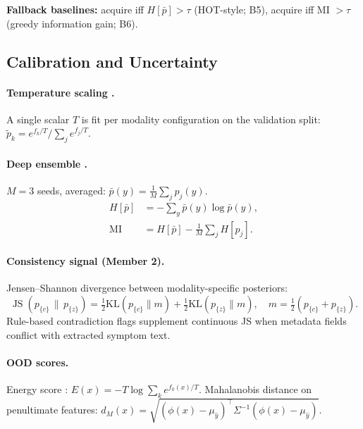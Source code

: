 \documentclass[conference]{IEEEtran}
\DeclareMathOperator{\JS}{JS}
\newcommand{\1}{\mathbf{1}}
\begin{document}
\noindent\textbf{Fallback baselines:} acquire iff $H[\bar{p}] > \tau$
(HOT-style; B5), acquire iff MI $> \tau$ (greedy information gain; B6).

\subsection{Calibration and Uncertainty}

\paragraph{Temperature scaling \cite{guo2017calibration}.}
A single scalar $T$ is fit per modality configuration on the validation
split: $\tilde{p}_k = e^{f_k/T} / \sum_j e^{f_j/T}$.

\paragraph{Deep ensemble \cite{lakshminarayanan2017ensembles}.}
$M=3$ seeds, averaged: $\bar{p}(y)=\frac{1}{M}\sum_j p_j(y)$.
\begin{align}
  H[\bar{p}] &= -\sum_y \bar{p}(y)\log\bar{p}(y), \label{eq:entropy}\\
  \text{MI}  &= H[\bar{p}] - \tfrac{1}{M}\textstyle\sum_j H[p_j]. \label{eq:mi}
\end{align}

\paragraph{Consistency signal (Member 2).}
Jensen--Shannon divergence between modality-specific posteriors:
\begin{equation}
  \JS(p_{\{c\}} \,\|\, p_{\{z\}}) =
    \tfrac{1}{2}\text{KL}(p_{\{c\}} \| m) +
    \tfrac{1}{2}\text{KL}(p_{\{z\}} \| m),\quad
  m = \tfrac{1}{2}(p_{\{c\}}+p_{\{z\}}).
  \label{eq:js}
\end{equation}
Rule-based contradiction flags supplement continuous JS when metadata fields
conflict with extracted symptom text.

\paragraph{OOD scores.}
Energy score \cite{liu2020energy}:
$E(x) = -T\log\sum_{k} e^{f_k(x)/T}.$
Mahalanobis distance \cite{lee2018mahalanobis} on penultimate features:
$d_M(x) = \sqrt{(\phi(x)-\mu_{\hat{y}})^\top \Sigma^{-1} (\phi(x)-\mu_{\hat{y}})}.$
\end{document}
